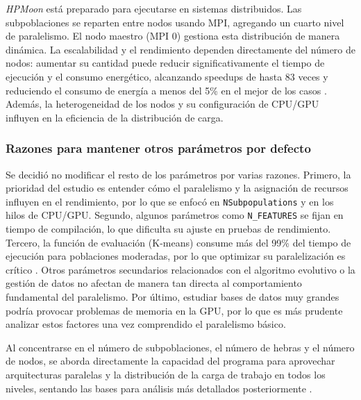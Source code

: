\textit{HPMoon} está preparado para ejecutarse en sistemas distribuidos. Las subpoblaciones se reparten entre nodos usando MPI, agregando un cuarto nivel de paralelismo. El nodo maestro (MPI 0) gestiona esta distribución de manera dinámica. La escalabilidad y el rendimiento dependen directamente del número de nodos: aumentar su cantidad puede reducir significativamente el tiempo de ejecución y el consumo energético, alcanzando speedups de hasta 83 veces y reduciendo el consumo de energía a menos del 5\% en el mejor de los casos \cite{escobar2020energy, Escobar2019}. Además, la heterogeneidad de los nodos y su configuración de CPU/GPU influyen en la eficiencia de la distribución de carga.

\subsubsection{Razones para mantener otros parámetros por defecto}

Se decidió no modificar el resto de los parámetros por varias razones. Primero, la prioridad del estudio es entender cómo el paralelismo y la asignación de recursos influyen en el rendimiento, por lo que se enfocó en \texttt{NSubpopulations} y en los hilos de CPU/GPU. Segundo, algunos parámetros como \texttt{N\_FEATURES} se fijan en tiempo de compilación, lo que dificulta su ajuste en pruebas de rendimiento. Tercero, la función de evaluación (K-means) consume más del 99\% del tiempo de ejecución para poblaciones moderadas, por lo que optimizar su paralelización es crítico \cite{escobar2020energy}. Otros parámetros secundarios relacionados con el algoritmo evolutivo o la gestión de datos no afectan de manera tan directa al comportamiento fundamental del paralelismo. Por último, estudiar bases de datos muy grandes podría provocar problemas de memoria en la GPU, por lo que es más prudente analizar estos factores una vez comprendido el paralelismo básico.

Al concentrarse en el número de subpoblaciones, el número de hebras y el número de nodos, se aborda directamente la capacidad del programa para aprovechar arquitecturas paralelas y la distribución de la carga de trabajo en todos los niveles, sentando las bases para análisis más detallados posteriormente \cite{escobar2020energy}.

